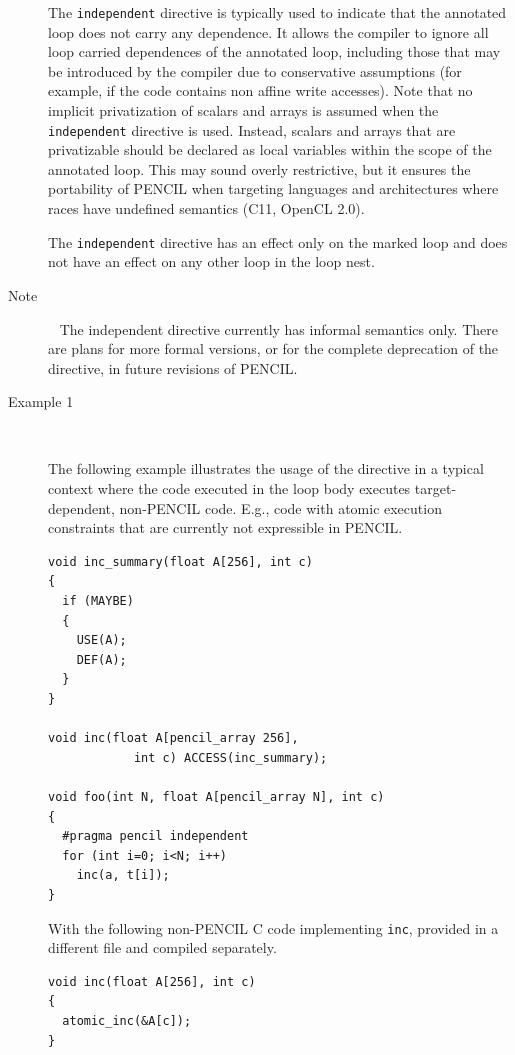 \documentclass{carp}
\begin{document}
\begin{description}
The \lstinline!independent! directive is typically used to indicate
that the annotated loop does not carry any dependence.  It allows the
compiler to ignore all loop carried dependences of the annotated loop,
including those that may be introduced by the compiler due to
conservative assumptions (for example, if the code contains non affine
write accesses).
Note that no implicit privatization of scalars and arrays is assumed when
the \lstinline!independent! directive is used.  Instead, scalars and
arrays that are privatizable should be declared as local variables
within the scope of the annotated loop.
This may sound overly restrictive, but it ensures the portability of
PENCIL when targeting languages and architectures where races have
undefined semantics (C11, OpenCL 2.0).

The \lstinline!independent! directive has an effect only on the marked loop
and does not have an effect on any other loop in the loop nest.

\item [Note]~
The independent directive currently has informal semantics only. There
are plans for more formal versions, or for the complete deprecation of
the directive, in future revisions of PENCIL.

\item [Example 1]~

  The following example illustrates the usage of the directive in a
  typical context where the code executed in the loop body executes
  target-dependent, non-PENCIL code. E.g., code with atomic execution
  constraints that are currently not expressible in PENCIL.
  \begin{lstlisting}[language=pencil]
void inc_summary(float A[256], int c)
{
  if (MAYBE)
  {
    USE(A);
    DEF(A);
  }
}

void inc(float A[pencil_array 256],
            int c) ACCESS(inc_summary);

void foo(int N, float A[pencil_array N], int c)
{
  #pragma pencil independent
  for (int i=0; i<N; i++)
    inc(a, t[i]);
}  
  \end{lstlisting}

  With the following non-PENCIL C code implementing \lstinline!inc!,
  provided in a different file and compiled separately.
  \begin{lstlisting}[language=pencil]
void inc(float A[256], int c)
{
  atomic_inc(&A[c]);
}
  \end{lstlisting}


\end{description}
\end{document}
